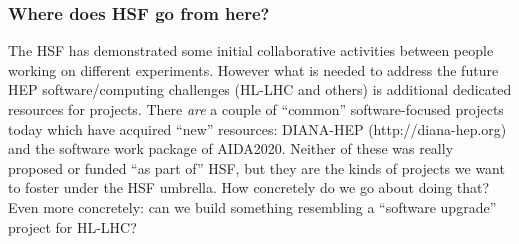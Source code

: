 \begin{frame}
\frametitle{Where does HSF go from here?}

  The HSF has demonstrated some initial collaborative activities between people working on different experiments. However what is needed to address the future HEP software/computing challenges (HL-LHC and others) is additional dedicated resources for projects.
\vskip 0.15in
  There {\em are} a couple of ``common'' software-focused projects today which have acquired ``new'' resources: DIANA-HEP (http://diana-hep.org) and the software work package of AIDA2020. Neither of these was really proposed or funded ``as part of'' HSF, but they are the kinds of projects we want to foster under the HSF umbrella. How concretely do we go about doing that?
\vskip 0.15in
Even more concretely: can we build something resembling a ``software upgrade'' project for HL-LHC? 
\end{frame}


